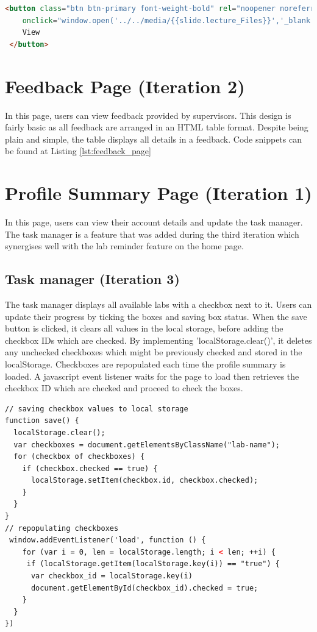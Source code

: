 \documentclass{l4proj}
\begin{document}
\begin{lstlisting}[language=HTML, caption={Django's template tag is used to check if a user has received any feedback}, label=lst:view_slide]
 <button class="btn btn-primary font-weight-bold" rel="noopener noreferrer"
    onclick="window.open('../../media/{{slide.lecture_Files}}','_blank')">
    View
 </button>
\end{lstlisting}

\section{Feedback Page (Iteration 2)}

In this page, users can view feedback provided by supervisors. This design is fairly basic as all feedback are arranged in an HTML table format. Despite being plain and simple, the table displays all details in a feedback. Code snippets can be found at Listing \ref{lst:feedback_page}


\section{Profile Summary Page (Iteration 1)}

In this page, users can view their account details and update the task manager. The task manager is a feature that was added during the third iteration which synergises well with the lab reminder feature on the home page. 

\subsection{Task manager (Iteration 3)}

The task manager displays all available labs with a checkbox next to it. Users can update their progress by ticking the boxes and saving box status. When the save button is clicked, it clears all values in the local storage, before adding the checkbox IDs which are checked. By implementing 'localStorage.clear()', it deletes any unchecked checkboxes which might be previously checked and stored in the localStorage. Checkboxes are repopulated each time the profile summary is loaded. A javascript event listener waits for the page to load then retrieves the checkbox ID which are checked and proceed to check the boxes.

\begin{lstlisting}[language=HTML, caption={JavaScript code snippets used to save and repopulate checkboxes.}, label=lst:task_manager]
// saving checkbox values to local storage
function save() {
  localStorage.clear();
  var checkboxes = document.getElementsByClassName("lab-name");
  for (checkbox of checkboxes) {
    if (checkbox.checked == true) {
      localStorage.setItem(checkbox.id, checkbox.checked);
    }
  }
}
// repopulating checkboxes
 window.addEventListener('load', function () {
    for (var i = 0, len = localStorage.length; i < len; ++i) {
     if (localStorage.getItem(localStorage.key(i)) == "true") {
      var checkbox_id = localStorage.key(i)
      document.getElementById(checkbox_id).checked = true;
    }
  }
})
\end{lstlisting}
\end{document}
